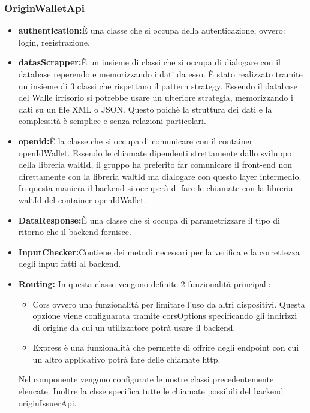 \subsubsection{OriginWalletApi}
\begin{itemize}
    \item \textbf{authentication:}È una classe che si occupa della autenticazione, ovvero: login, registrazione. 
    \item \textbf{datasScrapper:}È un insieme di classi che si occupa di dialogare con il database reperendo e memorizzando i dati da esso. È stato realizzato tramite un insieme di 3 classi che rispettano il pattern strategy. Essendo il database del Walle irrisorio si potrebbe usare un ulteriore strategia, memorizzando i dati su un file XML o JSON. Questo poichè la struttura dei dati e la complessità è semplice e senza relazioni particolari.
    \item \textbf{openid:}È la classe che si occupa di comunicare con il container openIdWallet. Essendo le chiamate dipendenti strettamente dallo sviluppo della libreria waltId, il gruppo ha preferito far comunicare il front-end non direttamente con la libreria waltId ma dialogare con questo layer intermedio. In questa maniera il backend si occuperà di fare le chiamate con la libreria waltId del container openIdWallet.
    \item \textbf{DataResponse:}È una classe che si occupa di parametrizzare il tipo di ritorno che il backend fornisce.
    \item \textbf{InputChecker:}Contiene dei metodi necessari per la verifica e la correttezza degli input fatti al backend.
    \item \textbf{Routing:} In questa classe vengono definite 2 funzionalità principali:
    \begin{itemize}
    \item Cors ovvero una funzionalità per limitare l'uso da altri dispositivi. Questa opzione viene configuarata tramite corsOptions specificando gli indirizzi di origine da cui un utilizzatore potrà usare il backend. 
    \item Express è una funzionalità che permette di offrire degli endpoint con cui un altro applicativo potrà fare delle chiamate http. 
    \end{itemize}
    Nel componente vengono configurate le nostre classi precedentemente elencate.
    Inoltre la clsse specifica tutte le chiamate possibili del backend originIssuerApi.
\end{itemize}

